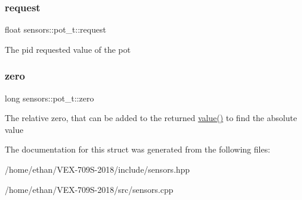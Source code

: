 \subsubsection{\texorpdfstring{request}{request}}
{\footnotesize\ttfamily float sensors\+::pot\+\_\+t\+::request}

The pid requested value of the pot \mbox{\label{structsensors_1_1pot__t_ad3678a63f0a9f4d3d3e864ec22161764}} 
\subsubsection{\texorpdfstring{zero}{zero}}
{\footnotesize\ttfamily long sensors\+::pot\+\_\+t\+::zero}

The relative zero, that can be added to the returned \hyperlink{structsensors_1_1pot__t_a239236592ff0507f459f6e8d40d12816}{value()} to find the absolute value 

The documentation for this struct was generated from the following files\+:\begin{DoxyCompactItemize}
\item 
/home/ethan/\+V\+E\+X-\/709\+S-\/2018/include/sensors.\+hpp\item 
/home/ethan/\+V\+E\+X-\/709\+S-\/2018/src/sensors.\+cpp\end{DoxyCompactItemize}
